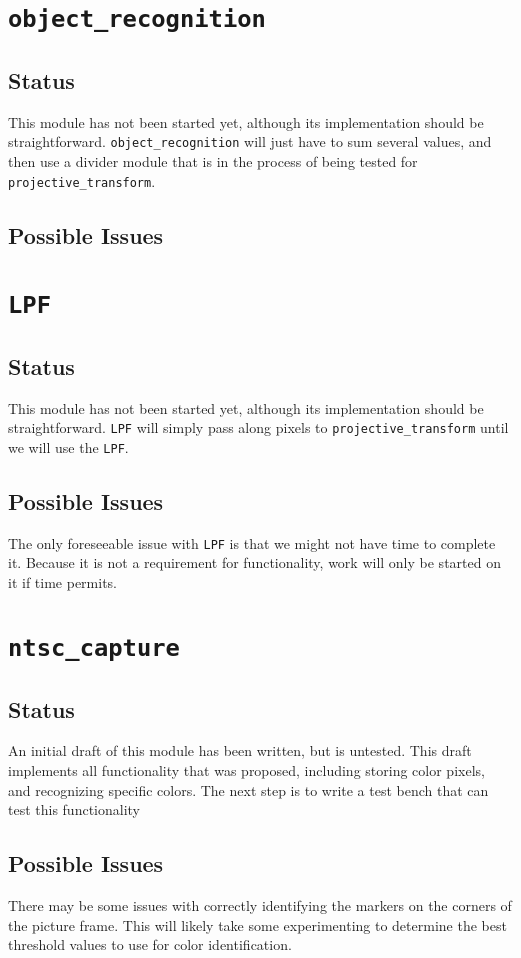 \documentclass{article}
\begin{document}
\section{{\tt object\_recognition}}
\subsection{Status} This module has not been started yet, although its implementation should be straightforward. {\tt object\_recognition} will just have to sum several values, and then use a divider module that is in the process of being tested for {\tt projective\_transform}.
\subsection{Possible Issues}

\section{{\tt LPF}}
\subsection{Status} This module has not been started yet, although its implementation should be straightforward. {\tt LPF} will simply pass along pixels to {\tt projective\_transform} until we will use the {\tt LPF}.
\subsection{Possible Issues} The only foreseeable issue with {\tt LPF} is that we might not have time to complete it. Because it is not a requirement for functionality, work will only be started on it if time permits.

\section{{\tt ntsc\_capture}}
\subsection{Status} An initial draft of this module has been written, but is untested. This draft implements all functionality that was proposed, including storing color pixels, and recognizing specific colors. The next step is to write a test bench that can test this functionality
\subsection{Possible Issues} There may be some issues with correctly identifying the markers on the corners of the picture frame. This will likely take some experimenting to determine the best threshold values to use for color identification.
\end{document}
